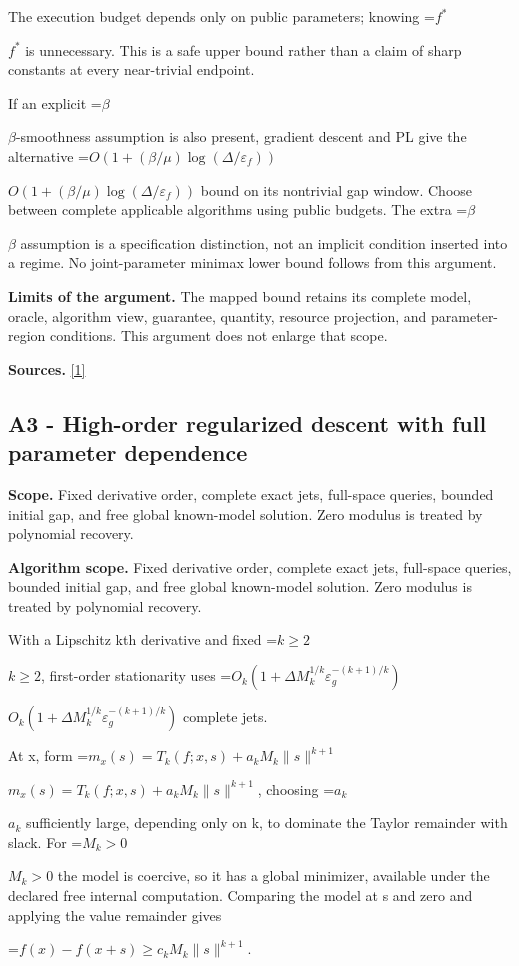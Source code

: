 \documentclass[10pt,a4paper]{article}
\newcommand{\AtlasMath}[1]{\par\begingroup\centering\setbox0=\hbox{$\displaystyle #1$}\ifdim\wd0>1.4\linewidth\typeout{ATLAS WIDE FORMULA: \the\wd0}\fi\ifdim\wd0>\linewidth\resizebox{\linewidth}{!}{\box0}\else\box0\fi\par\endgroup}
\newcommand{\AtlasInlineMath}[1]{\begingroup\setbox0=\hbox{$#1$}\ifdim\wd0>.4\linewidth\endgroup\AtlasMath{#1}\else\endgroup$#1$\fi}
\begin{document}
The execution budget depends only on public parameters; knowing \AtlasInlineMath{f^*} is unnecessary. This is a safe upper bound rather than a claim of sharp constants at every near-trivial endpoint.

If an explicit \AtlasInlineMath{\beta}-smoothness assumption is also present, gradient descent and PL give the alternative \AtlasInlineMath{O(1+(\beta/\mu)\log(\Delta/\varepsilon_f))} bound on its nontrivial gap window. Choose between complete applicable algorithms using public budgets. The extra \AtlasInlineMath{\beta} assumption is a specification distinction, not an implicit condition inserted into a regime. No joint-parameter minimax lower bound follows from this argument.

\textbf{Limits of the argument.} The mapped bound retains its complete model, oracle, algorithm view, guarantee, quantity, resource projection, and parameter-region conditions. This argument does not enlarge that scope.

\textbf{Sources.} \href{https://optimization-online.org/wp-content/uploads/2015/06/4970.pdf}{[1]}

\subsection{A3 - High-order regularized descent with full parameter dependence}
\textbf{Scope.} Fixed derivative order, complete exact jets, full-space queries, bounded initial gap, and free global known-model solution. Zero modulus is treated by polynomial recovery.

\textbf{Algorithm scope.} Fixed derivative order, complete exact jets, full-space queries, bounded initial gap, and free global known-model solution. Zero modulus is treated by polynomial recovery.

With a Lipschitz kth derivative and fixed \AtlasInlineMath{k\ge2}, first-order stationarity uses \AtlasInlineMath{O_k(1+\Delta M_k^{1/k}\varepsilon_g^{-(k+1)/k})} complete jets.

At x, form \AtlasInlineMath{m_x(s)=T_k(f;x,s)+a_kM_k\|s\|^{k+1}}, choosing \AtlasInlineMath{a_k} sufficiently large, depending only on k, to dominate the Taylor remainder with slack. For \AtlasInlineMath{M_k>0} the model is coercive, so it has a global minimizer, available under the declared free internal computation. Comparing the model at s and zero and applying the value remainder gives

\AtlasMath{f(x)-f(x+s)\ge c_kM_k\|s\|^{k+1}.}
\end{document}
